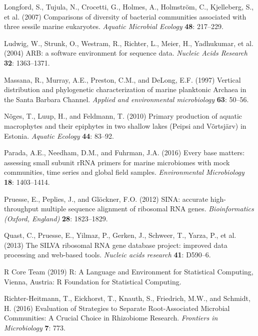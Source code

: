 \documentclass[12pt,]{article}
\begin{document}
\leavevmode\hypertarget{ref-Longford2007}{}%
Longford, S., Tujula, N., Crocetti, G., Holmes, A., Holmström, C.,
Kjelleberg, S., et al. (2007) Comparisons of diversity of bacterial
communities associated with three sessile marine eukaryotes.
\emph{Aquatic Microbial Ecology} \textbf{48}: 217--229.

\leavevmode\hypertarget{ref-Ludwig2004}{}%
Ludwig, W., Strunk, O., Westram, R., Richter, L., Meier, H., Yadhukumar,
et al. (2004) ARB: a software environment for sequence data.
\emph{Nucleic Acids Research} \textbf{32}: 1363--1371.

\leavevmode\hypertarget{ref-Massana1997}{}%
Massana, R., Murray, A.E., Preston, C.M., and DeLong, E.F. (1997)
Vertical distribution and phylogenetic characterization of marine
planktonic Archaea in the Santa Barbara Channel. \emph{Applied and
environmental microbiology} \textbf{63}: 50--56.

\leavevmode\hypertarget{ref-Noges2010}{}%
Nõges, T., Luup, H., and Feldmann, T. (2010) Primary production of
aquatic macrophytes and their epiphytes in two shallow lakes (Peipsi and
Võrtsjärv) in Estonia. \emph{Aquatic Ecology} \textbf{44}: 83--92.

\leavevmode\hypertarget{ref-Parada2016}{}%
Parada, A.E., Needham, D.M., and Fuhrman, J.A. (2016) Every base
matters: assessing small subunit rRNA primers for marine microbiomes
with mock communities, time series and global field samples.
\emph{Environmental Microbiology} \textbf{18}: 1403--1414.

\leavevmode\hypertarget{ref-Pruesse2012}{}%
Pruesse, E., Peplies, J., and Glöckner, F.O. (2012) SINA: accurate
high-throughput multiple sequence alignment of ribosomal RNA genes.
\emph{Bioinformatics (Oxford, England)} \textbf{28}: 1823--1829.

\leavevmode\hypertarget{ref-Quast2013}{}%
Quast, C., Pruesse, E., Yilmaz, P., Gerken, J., Schweer, T., Yarza, P.,
et al. (2013) The SILVA ribosomal RNA gene database project: improved
data processing and web-based tools. \emph{Nucleic acids research}
\textbf{41}: D590--6.

\leavevmode\hypertarget{ref-RCoreTeam2019}{}%
R Core Team (2019) R: A Language and Environment for Statistical
Computing, Vienna, Austria: R Foundation for Statistical Computing.

\leavevmode\hypertarget{ref-Richter-Heitmann2016}{}%
Richter-Heitmann, T., Eickhorst, T., Knauth, S., Friedrich, M.W., and
Schmidt, H. (2016) Evaluation of Strategies to Separate Root-Associated
Microbial Communities: A Crucial Choice in Rhizobiome Research.
\emph{Frontiers in Microbiology} \textbf{7}: 773.
\end{document}
